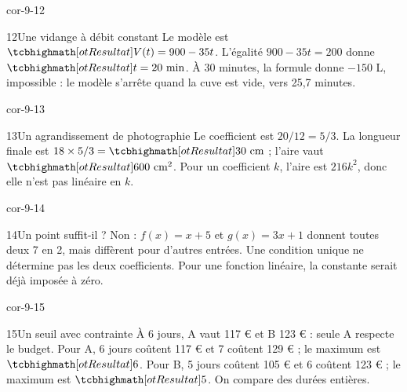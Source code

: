 \begin{blocLivre}{cor-9-12}\begin{corrige}{12}{Une vidange à débit constant}
Le modèle est $\res{V(t)=900-35t}$. L’égalité $900-35t=200$ donne $\res{t=20\text{ min}}$. À 30 minutes, la formule donne $-150$ L, impossible : le modèle s’arrête quand la cuve est vide, vers 25,7 minutes.
\end{corrige}\end{blocLivre}
\begin{blocLivre}{cor-9-13}\begin{corrige}{13}{Un agrandissement de photographie}
Le coefficient est $20/12=5/3$. La longueur finale est $18\times5/3=\res{30\text{ cm}}$ ; l’aire vaut $\res{600\text{ cm}^2}$. Pour un coefficient $k$, l’aire est $216k^2$, donc elle n’est pas linéaire en $k$.
\end{corrige}\end{blocLivre}
\begin{blocLivre}{cor-9-14}\begin{corrige}{14}{Un point suffit-il ?}
Non : $f(x)=x+5$ et $g(x)=3x+1$ donnent toutes deux 7 en 2, mais diffèrent pour d’autres entrées. Une condition unique ne détermine pas les deux coefficients. Pour une fonction linéaire, la constante serait déjà imposée à zéro.
\end{corrige}\end{blocLivre}
\begin{blocLivre}{cor-9-15}\begin{corrige}{15}{Un seuil avec contrainte}
À 6 jours, A vaut 117 € et B 123 € : seule A respecte le budget. Pour A, 6 jours coûtent 117 € et 7 coûtent 129 € ; le maximum est $\res6$. Pour B, 5 jours coûtent 105 € et 6 coûtent 123 € ; le maximum est $\res5$. On compare des durées entières.
\end{corrige}\end{blocLivre}

